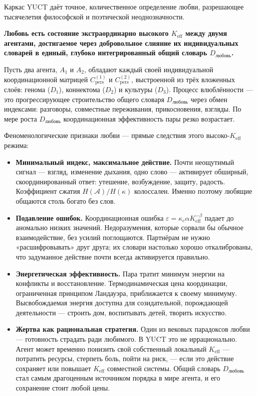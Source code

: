 \documentclass[12pt,a4paper]{article}
\begin{document}
	Каркас YUCT даёт точное, количественное определение любви, разрешающее тысячелетия философской и поэтической неоднозначности.
	
	\textbf{Любовь есть состояние экстраординарно высокого \(K_{\mathrm{eff}}\) между двумя агентами, достигаемое через добровольное слияние их индивидуальных словарей в единый, глубоко интегрированный общий словарь \(D_{\text{любовь}}\).}
	
	Пусть два агента, \(A_1\) и \(A_2\), обладают каждый своей индивидуальной координационной матрицей \(C_{\text{pers}}^{(1)}\) и \(C_{\text{pers}}^{(2)}\), выстроенной из трёх вложенных слоёв: генома (\(D_1\)), коннектома (\(D_2\)) и культуры (\(D_3\)). Процесс влюблённости — это прогрессирующее строительство общего словаря \(D_{\text{любовь}}\) через обмен индексами: разговоры, совместные переживания, прикосновения, взгляды. По мере роста \(D_{\text{любовь}}\) координационная эффективность пары резко возрастает.
	
	Феноменологические признаки любви — прямые следствия этого высоко‑\(K_{\mathrm{eff}}\) режима:
	
	\begin{itemize}[leftmargin=*]
		\item \textbf{Минимальный индекс, максимальное действие.} Почти неощутимый сигнал — взгляд, изменение дыхания, одно слово — активирует обширный, скоординированный ответ: утешение, возбуждение, защиту, радость. Коэффициент сжатия \(H(\mathcal{A}) / H(\kappa)\) колоссален. Именно поэтому любящие общаются столь богато без слов.
		\item \textbf{Подавление ошибок.} Координационная ошибка \(\varepsilon = \kappa_c \alpha K_{\mathrm{eff}}^{-\beta}\) падает до аномально низких значений. Недоразумения, которые сорвали бы обычное взаимодействие, без усилий поглощаются. Партнёрам не нужно «расшифровывать» друг друга; их словари настолько хорошо откалиброваны, что задуманное действие почти всегда активируется правильно.
		\item \textbf{Энергетическая эффективность.} Пара тратит минимум энергии на конфликты и восстановление. Термодинамическая цена координации, ограниченная принципом Ландауэра, приближается к своему минимуму. Высвобождаемая энергия доступна для созидательной, порождающей деятельности — строить дом, воспитывать детей, творить искусство.
		\item \textbf{Жертва как рациональная стратегия.} Один из вековых парадоксов любви — готовность страдать ради любимого. В YUCT это не иррационально. Агент может временно понизить свой собственный локальный \(K_{\mathrm{eff}}\) — потратить ресурсы, стерпеть боль, пойти на риск, — если это действие сохраняет или повышает \(K_{\mathrm{eff}}\) совместной системы. Общий словарь \(D_{\text{любовь}}\) стал самым драгоценным источником порядка в мире агента, и его сохранение стоит любой цены.
	\end{itemize}
	
\end{document}
